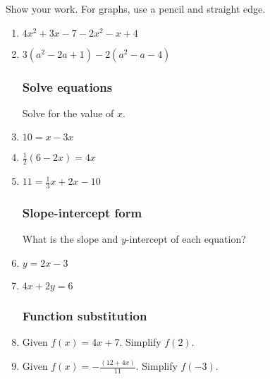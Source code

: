 \documentclass[12pt, oneside]{article}
\begin{document}
Show your work. For graphs, use a pencil and straight edge.
  \begin{enumerate}
\subsubsection*{Simplify expressions}

  \item $4x^2+3x -7 -2x^2-x+4$ \vspace{3cm}
  \item $3(a^2-2a +1) -2(a^2-a-4)$ \vspace{3cm}

\subsubsection*{Solve equations}

Solve for the value of $x$.
\item   $10=x-3x$ \vspace{3cm}
\item   $\frac{1}{2}(6-2x)=4x$ \vspace{3cm}
\item   $11=\frac{1}{3}x+2x-10$ \vspace{3cm}

\newpage
\subsubsection*{Slope-intercept form}

What is the slope and $y$-intercept of each equation?
\item   $y=2x-3$ \vspace{2cm}
\item   $4x+2y=6$ \vspace{3cm}


\subsubsection*{Function substitution}
\item Given $f(x)=4x+7$. Simplify $f(2)$. \vspace{4cm}
\item Given $\displaystyle f(x)=-\frac{(12+4x)}{11}$. Simplify $f(-3)$.

\newpage

\end{enumerate}
\end{document}
